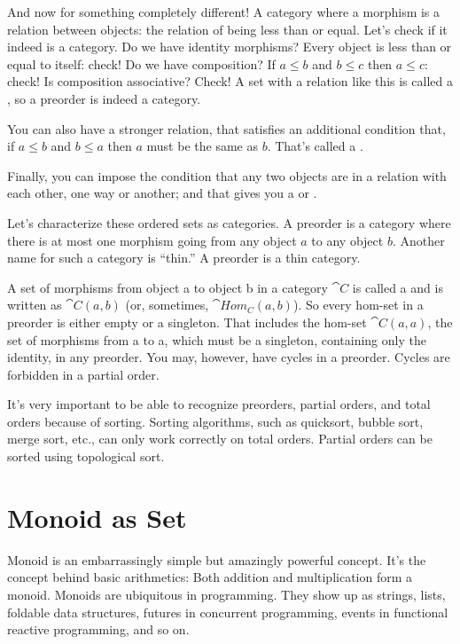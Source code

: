And now for something completely different! A category where a morphism
is a relation between objects: the relation of being less than or equal.
Let's check if it indeed is a category. Do we have identity morphisms?
Every object is less than or equal to itself: check! Do we have
composition? If $a \leq b$ and $b \leq c$ then $a \leq c$: check! Is composition associative? Check! A set with a
relation like this is called a , so a preorder is indeed
a category.

You can also have a stronger relation, that satisfies an additional
condition that, if $a \leq b$ and $b \leq a$ then $a$ must be
the same as $b$. That's called a .

Finally, you can impose the condition that any two objects are in a
relation with each other, one way or another; and that gives you a
 or .

Let's characterize these ordered sets as categories. A preorder is a
category where there is at most one morphism going from any object $a$ to
any object $b$. Another name for such a category is ``thin.'' A preorder
is a thin category.

A set of morphisms from object a to object b in a category $\cat{C}$ is called a
 and is written as $\cat{C}(a, b)$ (or, sometimes,
$\cat{Hom_C}(a, b)$). So every hom-set in a preorder is either
empty or a singleton. That includes the hom-set $\cat{C}(a, a)$, the set of
morphisms from a to a, which must be a singleton, containing only the
identity, in any preorder. You may, however, have cycles in a preorder.
Cycles are forbidden in a partial order.

It's very important to be able to recognize preorders, partial orders,
and total orders because of sorting. Sorting algorithms, such as
quicksort, bubble sort, merge sort, etc., can only work correctly on
total orders. Partial orders can be sorted using topological sort.

\section{Monoid as Set}\label{monoid-as-set}

Monoid is an embarrassingly simple but amazingly powerful concept. It's
the concept behind basic arithmetics: Both addition and multiplication
form a monoid. Monoids are ubiquitous in programming. They show up as
strings, lists, foldable data structures, futures in concurrent
programming, events in functional reactive programming, and so on.

